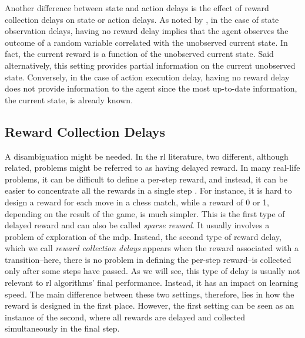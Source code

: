 Another difference between state and action delays is the effect of reward collection delays on state or action delays. 
As noted by \cite{katsikopoulos2003markov}, in the case of state observation delays, having no reward delay implies that the agent observes the outcome of a random variable correlated with the unobserved current state.
In fact, the current reward is a function of the unobserved current state.
Said alternatively, this setting provides partial information on the current unobserved state. 
Conversely, in the case of action execution delay, having no reward delay does not provide information to the agent since the most up-to-date information, the current state, is already known. 


\subsection{Reward Collection Delays}
\label{subsec:reward_delay}
A disambiguation might be needed. 
In the \gls{rl} literature, two different, although related, problems might be referred to as having delayed reward. 
In many real-life problems, it can be difficult to define a per-step reward, and instead, it can be easier to concentrate all the rewards in a single step \cite{han2022off}. 
For instance, it is hard to design a reward for each move in a chess match, while a reward of 0 or 1, depending on the result of the game, is much simpler.
This is the first type of delayed reward and can also be called \emph{sparse reward}. 
It usually involves a problem of exploration of the \gls{mdp}.
Instead, the second type of reward delay, which we call \emph{reward collection delays} appears when the reward associated with a transition--here, there is no problem in defining the per-step reward--is collected only after some steps have passed. 
As we will see, this type of delay is usually not relevant to \gls{rl} algorithms' final performance. 
Instead, it has an impact on learning speed.
The main difference between these two settings, therefore, lies in how the reward is designed in the first place. 
However, the first setting can be seen as an instance of the second, where all rewards are delayed and collected simultaneously in the final step. 


